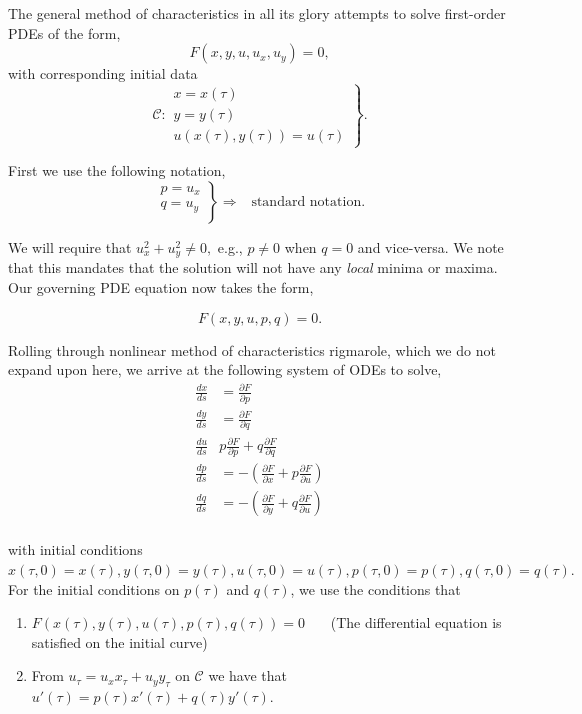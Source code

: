 The general method of characteristics in all its glory attempts to solve first-order PDEs of the form, $$F(x,y,u,u_x,u_y)=0,$$ with corresponding initial data $$\mathscr{C}: \left. \begin{array}{c} x=x(\tau) \\ y=y(\tau) \\ u(x(\tau),y(\tau)) = u(\tau) \end{array} \right\}.$$

First we use the following notation,
$$\left. \begin{array}{c}
p = u_x \\
q = u_y \\
\end{array} \right\} \Rightarrow \ \ \mbox{ standard notation}.$$

We will require that $u_x^2 + u_y^2 \neq 0,$ e.g., $p\neq 0$ when $q=0$ and vice-versa. We note that this mandates that the solution will not have any \emph{local} minima or maxima. Our governing PDE equation now takes the form, 

$$F(x,y,u,p,q) = 0.$$

Rolling through nonlinear method of characteristics rigmarole, which we do not expand upon here, we arrive at the following system of ODEs to solve,
\begin{align*}
\frac{dx}{ds} &= \frac{\partial F}{\partial p} \\
\frac{dy}{ds} &= \frac{\partial F}{\partial q} \\
\frac{du}{ds} & p\frac{\partial F}{\partial p} + q\frac{\partial F}{\partial q} \\
\frac{dp}{ds} &= -\left( \frac{\partial F}{\partial x} + p\frac{\partial F}{\partial u} \right) \\
\frac{dq}{ds} &= -\left( \frac{\partial F}{\partial y} + q\frac{\partial F}{\partial u} \right) \\
\end{align*}

with initial conditions $x(\tau,0)=x(\tau), y(\tau,0)=y(\tau), u(\tau,0)=u(\tau), p(\tau,0)=p(\tau), q(\tau,0)=q(\tau).$ For the initial conditions on $p(\tau)$ and $q(\tau)$, we use the conditions that

\begin{enumerate}
\item $F(x(\tau),y(\tau),u(\tau),p(\tau),q(\tau)) = 0$ \ \ \ (The differential equation is satisfied on the initial curve)
\item From $u_\tau = u_x x_\tau + u_y y_\tau$ on $\mathscr{C}$ we have that $u'(\tau) = p(\tau) x'(\tau) + q(\tau) y'(\tau).$
\end{enumerate}

